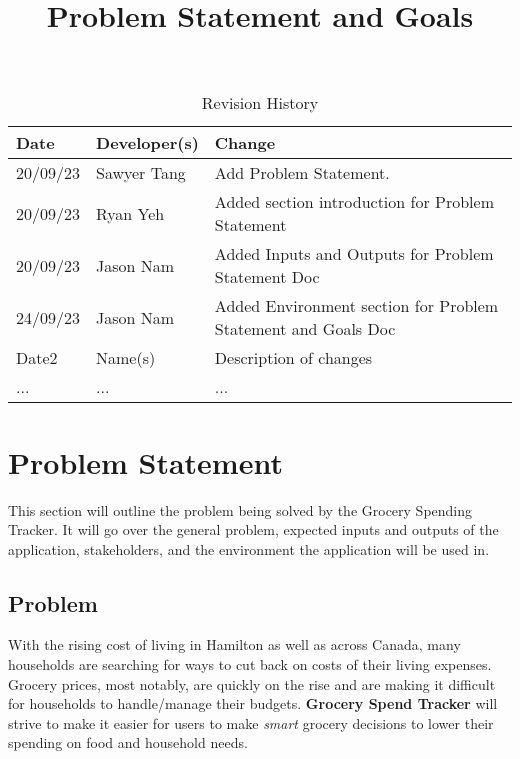 \documentclass{article}
\title{Problem Statement and Goals\\\progname}
\author{\authname}
\date{}
\begin{document}
\maketitle

\begin{table}[hp]
\caption{Revision History} \label{TblRevisionHistory}
\begin{tabularx}{\textwidth}{llX}
\toprule
\textbf{Date} & \textbf{Developer(s)} & \textbf{Change}\\
\midrule
20/09/23 & Sawyer Tang & Add Problem Statement.\\
20/09/23 & Ryan Yeh & Added section introduction for Problem Statement\\
20/09/23 & Jason Nam & Added Inputs and Outputs for Problem Statement Doc\\
24/09/23 & Jason Nam & Added Environment section for Problem Statement and Goals Doc\\
Date2 & Name(s) & Description of changes\\
... & ... & ...\\
\bottomrule
\end{tabularx}
\end{table}

\section{Problem Statement}


This section will outline the problem being solved by the Grocery Spending Tracker. It will go
over the general problem, expected inputs and outputs of the application, stakeholders, and the environment
the application will be used in.

\subsection{Problem}

With the rising cost of living in Hamilton as well as across Canada, many households are searching for ways to cut back on costs of their living expenses. Grocery prices, most notably, are quickly on the rise and are making it difficult for households to handle/manage their budgets. \textbf{Grocery Spend Tracker} will strive to make it easier for users to make \textit{smart} grocery decisions to lower their spending on food and household needs.
\end{document}
